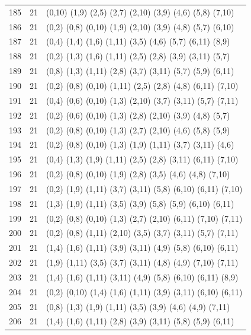 \begin{appendix}
{\begin{longtable}{lll}
185& 21 & (0,10)  (1,9)  (2,5)  (2,7)   (2,10)  (3,9)   (4,6)   (5,8)   (7,10)\\
186& 21 & (0,2)   (0,8)  (0,10) (1,9)   (2,10)  (3,9)   (4,8)   (5,7)   (6,10)\\
187& 21 & (0,4)   (1,4)  (1,6)  (1,11)  (3,5)   (4,6)   (5,7)   (6,11)  (8,9)\\
188& 21 & (0,2)   (1,3)  (1,6)  (1,11)  (2,5)   (2,8)   (3,9)   (3,11)  (5,7)\\
189& 21 & (0,8)   (1,3)  (1,11) (2,8)   (3,7)   (3,11)  (5,7)   (5,9)   (6,11)\\
190& 21 & (0,2)   (0,8)  (0,10) (1,11)  (2,5)   (2,8)   (4,8)   (6,11)  (7,10)\\
191& 21 & (0,4)   (0,6)  (0,10) (1,3)   (2,10)  (3,7)   (3,11)  (5,7)   (7,11)\\
192& 21 & (0,2)   (0,6)  (0,10) (1,3)   (2,8)   (2,10)  (3,9)   (4,8)   (5,7)\\
193& 21 & (0,2)   (0,8)  (0,10) (1,3)   (2,7)   (2,10)  (4,6)   (5,8)   (5,9)\\
194& 21 & (0,2)   (0,8)  (0,10) (1,3)   (1,9)   (1,11)  (3,7)   (3,11)  (4,6)\\
195& 21 & (0,4)   (1,3)  (1,9)  (1,11)  (2,5)   (2,8)   (3,11)  (6,11)  (7,10)\\
196& 21 & (0,2)   (0,8)  (0,10) (1,9)   (2,8)   (3,5)   (4,6)   (4,8)   (7,10)\\
197& 21 & (0,2)   (1,9)  (1,11) (3,7)   (3,11)  (5,8)   (6,10)  (6,11)  (7,10)\\
198& 21 & (1,3)   (1,9)  (1,11) (3,5)   (3,9)   (5,8)   (5,9)   (6,10)  (6,11)\\
199& 21 & (0,2)   (0,8)  (0,10) (1,3)   (2,7)   (2,10)  (6,11)  (7,10)  (7,11)\\
200& 21 & (0,2)   (0,8)  (1,11) (2,10)  (3,5)   (3,7)   (3,11)  (5,7)   (7,11)\\
201& 21 & (1,4)   (1,6)  (1,11) (3,9)   (3,11)  (4,9)   (5,8)   (6,10)  (6,11)\\
202& 21 & (1,9)   (1,11) (3,5)  (3,7)   (3,11)  (4,8)   (4,9)   (7,10)  (7,11)\\
203& 21 & (1,4)   (1,6)  (1,11) (3,11)  (4,9)   (5,8)   (6,10)  (6,11)  (8,9)\\
204& 21 & (0,2)   (0,10) (1,4)  (1,6)   (1,11)  (3,9)   (3,11)  (6,10)  (6,11)\\
205& 21 & (0,8)   (1,3)  (1,9)  (1,11)  (3,5)   (3,9)   (4,6)   (4,9)   (7,11)\\
206& 21 & (1,4)   (1,6)  (1,11) (2,8)   (3,9)   (3,11)  (5,8)   (5,9)   (6,11)\\

\end{longtable}}
\end{appendix}
